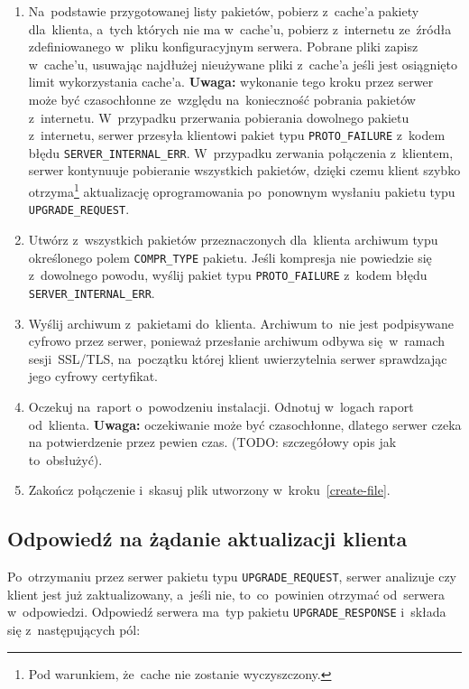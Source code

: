 \documentclass[thesis]{subfiles}
\begin{document}
\begin{enumerate}
	\item Na~podstawie przygotowanej listy pakietów, pobierz z~cache'a pakiety dla~klienta, a~tych których nie ma w~cache'u, pobierz z~internetu ze~źródła zdefiniowanego w~pliku konfiguracyjnym serwera. Pobrane pliki zapisz w~cache'u, usuwając najdłużej nieużywane pliki z~cache'a jeśli jest osiągnięto limit wykorzystania cache'a. \textbf{Uwaga:} wykonanie tego kroku przez serwer może być czasochłonne ze~względu na~konieczność pobrania pakietów z~internetu. W~przypadku przerwania pobierania dowolnego pakietu z~internetu, serwer przesyła klientowi pakiet typu \texttt{PROTO\_FAILURE} z~kodem błędu \texttt{SERVER\_INTERNAL\_ERR}. W~przypadku zerwania połączenia z~klientem, serwer kontynuuje pobieranie wszystkich pakietów, dzięki czemu klient szybko otrzyma\footnote{Pod warunkiem, że~cache nie zostanie wyczyszczony.} aktualizację oprogramowania po~ponownym wysłaniu pakietu typu \texttt{UPGRADE\_REQUEST}.
	\item Utwórz z~wszystkich pakietów przeznaczonych dla~klienta archiwum typu określonego polem \texttt{COMPR\_TYPE} pakietu. Jeśli kompresja nie powiedzie się z~dowolnego powodu, wyślij pakiet typu \texttt{PROTO\_FAILURE} z~kodem błędu \texttt{SERVER\_INTERNAL\_ERR}.
	\item Wyślij archiwum z~pakietami do~klienta. Archiwum to~nie jest podpisywane cyfrowo przez serwer, ponieważ przesłanie archiwum odbywa się~w~ramach sesji~SSL/TLS, na~początku której klient uwierzytelnia serwer sprawdzając jego cyfrowy certyfikat.
	\item Oczekuj na~raport o~powodzeniu instalacji. Odnotuj w~logach raport od~klienta. \textbf{Uwaga:} oczekiwanie może być czasochłonne, dlatego serwer czeka na potwierdzenie przez pewien czas. (TODO: szczegółowy opis jak to~obsłużyć).
	\item Zakończ połączenie i~skasuj plik utworzony w~kroku~\ref{create-file}.
\end{enumerate}


\subsection{Odpowiedź na żądanie aktualizacji klienta}
\label{full-upgrade-response}

Po~otrzymaniu przez serwer pakietu typu \texttt{UPGRADE\_REQUEST}, serwer analizuje czy klient jest już zaktualizowany, a~jeśli nie, to~co~powinien otrzymać od~serwera w~odpowiedzi. Odpowiedź serwera ma~typ pakietu \texttt{UPGRADE\_RESPONSE} i~składa się z~następujących pól:
\end{document}
